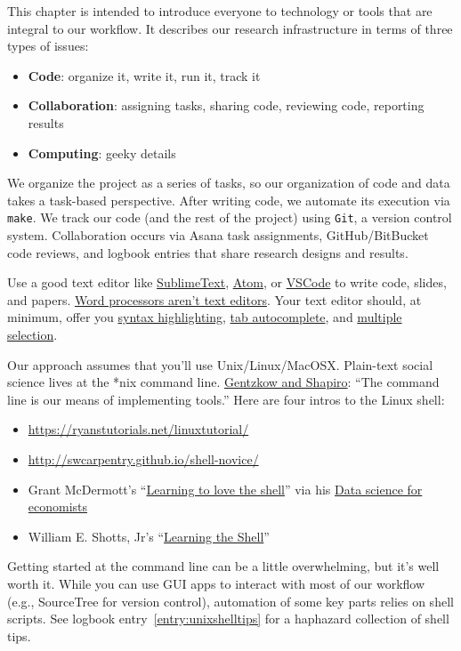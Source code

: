 This chapter is intended to introduce everyone to technology or tools that are integral to our workflow.
It describes our research infrastructure in terms of three types of issues:
\begin{itemize}
\item \textbf{Code}: organize it, write it, run it, track it
\item \textbf{Collaboration}: assigning tasks, sharing code, reviewing code, reporting results
\item \textbf{Computing}: geeky details
\end{itemize}

We organize the project as a series of tasks, so our organization of code and data takes a task-based perspective.
After writing code, we automate its execution via \texttt{make}.
We track our code (and the rest of the project) using \texttt{Git}, a version control system.
Collaboration occurs via Asana task assignments, GitHub/BitBucket code reviews, and logbook entries that share research designs and results.

Use a good text editor like
\href{https://www.sublimetext.com/}{SublimeText},
\href{https://atom.io/}{Atom},
or
\href{https://code.visualstudio.com/}{VSCode}
to write code, slides, and papers.
\href{http://plain-text.co/write-and-edit.html}{Word processors aren't text editors}.
Your text editor should, at minimum, offer you
\href{https://en.wikipedia.org/wiki/Syntax_highlighting}{syntax highlighting},
\href{https://en.wikipedia.org/wiki/Command-line_completion}{tab autocomplete},
and \href{https://www.sublimetext.com/}{multiple selection}.

Our approach assumes that you'll use Unix/Linux/MacOSX.
Plain-text social science lives at the *nix command line.
\href{https://github.com/gslab-econ/ra-manual/wiki/Getting-Started}{Gentzkow and Shapiro}: ``The command line is our means of implementing tools.''
Here are four intros to the Linux shell:
\begin{itemize}
	\item \url{https://ryanstutorials.net/linuxtutorial/}
	\item \url{http://swcarpentry.github.io/shell-novice/}
	\item Grant McDermott's ``\href{https://raw.githack.com/uo-ec607/lectures/master/03-shell/03-shell.html\#1}{Learning to love the shell}'' via his \href{https://github.com/uo-ec607/lectures}{Data science for economists}
	\item William E. Shotts, Jr's ``\href{http://linuxcommand.org/lc3_learning_the_shell.php}{Learning the Shell}''
\end{itemize}
Getting started at the command line can be a little overwhelming, but it's well worth it.
While you can use GUI apps to interact with most of our workflow (e.g., SourceTree for version control),
automation of some key parts relies on shell scripts.
See logbook entry~\ref{entry:unixshelltips} for a haphazard collection of shell tips.

